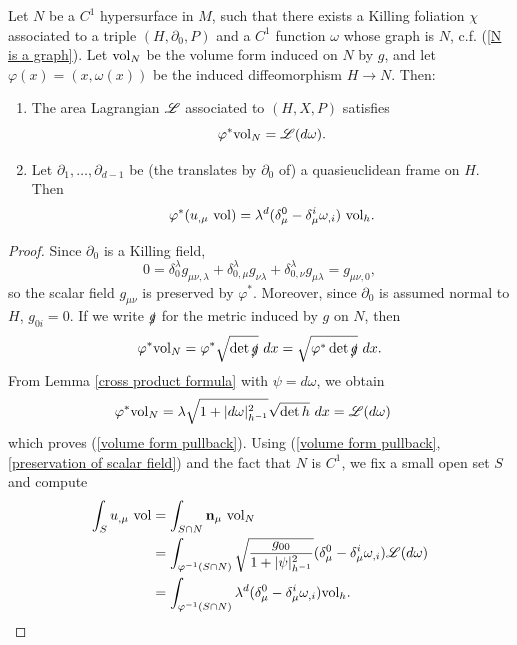 \begin{lemma}\label{volume form is Lagrangian}
Let $N$ be a $C^1$ hypersurface in $M$, such that there exists a Killing foliation $\chi$ associated to a triple $(H, \partial_0, P)$ and a $C^1$ function $\omega$ whose graph is $N$, c.f. (\ref{N is a graph}).
Let $\mathrm{vol}_N$ be the volume form induced on $N$ by $g$, and let $\varphi(x) = (x, \omega(x))$ be the induced diffeomorphism $H \to N$.
Then:
\begin{enumerate}
\item The area Lagrangian $\mathscr L$ associated to $(H, X, P)$ satisfies
\begin{equation}\label{volume form pullback}
\varphi^* \mathrm{vol}_N = \mathscr L(d\omega).
\end{equation}
\item Let $\partial_1, \dots, \partial_{d - 1}$ be (the translates by $\partial_0$ of) a quasieuclidean frame on $H$. Then
$$\varphi^*(u_{,\mu} ~\mathrm{vol}) = \lambda^d (\delta_\mu^0 - \delta^i_\mu \omega_{,i}) ~\mathrm{vol}_h.$$
\end{enumerate}
\end{lemma}
\begin{proof}
Since $\partial_0$ is a Killing field,
\begin{equation}\label{preservation of scalar field}
0 = \delta^\lambda_0 g_{\mu \nu,\lambda} + \delta^\lambda_{0,\mu} g_{\nu\lambda} + \delta^\lambda_{0,\nu} g_{\mu \lambda} = g_{\mu\nu,0},
\end{equation}
so the scalar field $g_{\mu\nu}$ is preserved by $\varphi^*$.
Moreover, since $\partial_0$ is assumed normal to $H$, $g_{0i} = 0$.
If we write $\slashed g$ for the metric induced by $g$ on $N$, then
$$\varphi^* \mathrm{vol}_N = \varphi^* \sqrt{\det \slashed g} ~dx = \sqrt{\varphi^* \det \slashed g} ~dx.$$
From Lemma \ref{cross product formula} with $\psi = d\omega$, we obtain
\begin{align*}
\varphi^* \mathrm{vol}_N &= \lambda\sqrt{1 + |d\omega|_{h^{-1}}^2} \sqrt{\det h} ~dx = \mathscr L(d\omega)
\end{align*}
which proves (\ref{volume form pullback}).
Using (\ref{volume form pullback}, \ref{preservation of scalar field}) and the fact that $N$ is $C^1$, we fix a small open set $S$ and compute
\begin{align*}
\int_S u_{,\mu} ~\mathrm{vol} &= \int_{S \cap N} \mathbf n_\mu ~\mathrm{vol}_N \\
&= \int_{\varphi^{-1}(S \cap N)} \sqrt{\frac{g_{00}}{1 + |\psi|_{h^{-1}}^2}} (\delta_\mu^0 - \delta_\mu^i \omega_{,i})\mathscr L(d\omega) \\
&= \int_{\varphi^{-1}(S \cap N)} \lambda^d (\delta_\mu^0 - \delta_\mu^i \omega_{,i}) \mathrm{vol}_h \qedhere.
\end{align*}
\end{proof}

